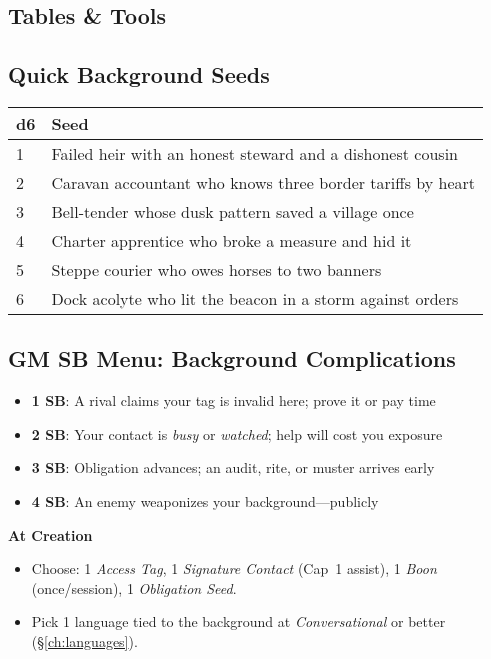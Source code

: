 \begin{multicols}{2}
\section{Tables \& Tools}

\subsection*{Quick Background Seeds}
\small
\begin{tabular}{ll}
\toprule
d6 & Seed \\
\midrule
1 & Failed heir with an honest steward and a dishonest cousin \\
2 & Caravan accountant who knows three border tariffs by heart \\
3 & Bell-tender whose dusk pattern saved a village once \\
4 & Charter apprentice who broke a measure and hid it \\
5 & Steppe courier who owes horses to two banners \\
6 & Dock acolyte who lit the beacon in a storm against orders \\
\bottomrule
\end{tabular}
\normalsize

\subsection*{GM SB Menu: Background Complications}
\begin{itemize}
\item \textbf{1 SB}: A rival claims your tag is invalid here; prove it or pay time
\item \textbf{2 SB}: Your contact is \emph{busy} or \emph{watched}; help will cost you exposure
\item \textbf{3 SB}: Obligation advances; an audit, rite, or muster arrives early
\item \textbf{4 SB}: An enemy weaponizes your background—publicly
\end{itemize}

\begin{tcolorbox}[colback=blue!5!white,colframe=blue!75!black,title=Background Quick Reference,fonttitle=\bfseries]
\textbf{At Creation}
\begin{itemize}
\item Choose: 1 \emph{Access Tag}, 1 \emph{Signature Contact} (Cap~1 assist), 1 \emph{Boon} (once/session), 1 \emph{Obligation Seed}.
\item Pick 1 language tied to the background at \emph{Conversational} or better (\S\ref{ch:languages}).
\end{itemize}


\end{tcolorbox}
\end{multicols}
